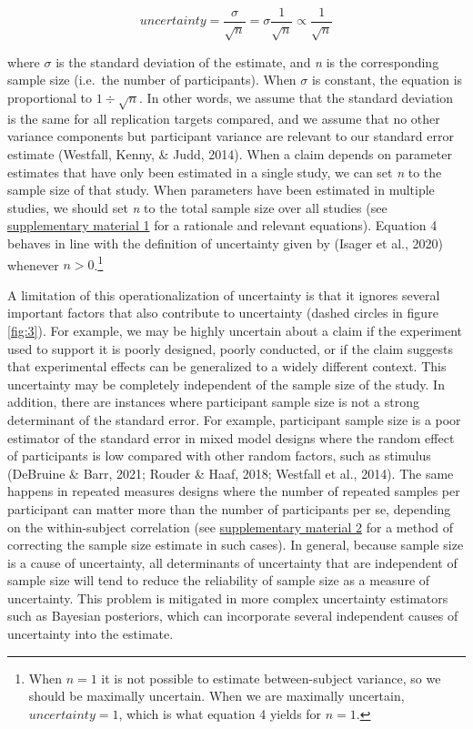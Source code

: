 \documentclass[
  english,
  man,floatsintext]{apa6}
\begin{document}
\begin{equation} 
  \tag{5}
  uncertainty=\frac{\sigma}{\sqrt{n}}=\sigma\frac{1}{\sqrt{n}}\propto\frac{1}{\sqrt{n}}
  \label{eq:5}
\end{equation}

where \(\sigma\) is the standard deviation of the estimate, and \emph{n} is the corresponding sample size (i.e.~the number of participants). When \(\sigma\) is constant, the equation is proportional to \(1\div\sqrt{n}\). In other words, we assume that the standard deviation is the same for all replication targets compared, and we assume that no other variance components but participant variance are relevant to our standard error estimate (Westfall, Kenny, \& Judd, 2014). When a claim depends on parameter estimates that have only been estimated in a single study, we can set \emph{n} to the sample size of that study. When parameters have been estimated in multiple studies, we should set \emph{n} to the total sample size over all studies (see \href{https://osf.io/rdhw3/}{supplementary material 1} for a rationale and relevant equations). Equation 4 behaves in line with the definition of uncertainty given by (Isager et al., 2020) whenever \(n>0\).\footnote{When \(n=1\) it is not possible to estimate between-subject variance, so we should be maximally uncertain. When we are maximally uncertain, \(uncertainty=1\), which is what equation 4 yields for \(n=1\).}

A limitation of this operationalization of uncertainty is that it ignores several important factors that also contribute to uncertainty (dashed circles in figure \ref{fig:3}). For example, we may be highly uncertain about a claim if the experiment used to support it is poorly designed, poorly conducted, or if the claim suggests that experimental effects can be generalized to a widely different context. This uncertainty may be completely independent of the sample size of the study. In addition, there are instances where participant sample size is not a strong determinant of the standard error. For example, participant sample size is a poor estimator of the standard error in mixed model designs where the random effect of participants is low compared with other random factors, such as stimulus (DeBruine \& Barr, 2021; Rouder \& Haaf, 2018; Westfall et al., 2014). The same happens in repeated measures designs where the number of repeated samples per participant can matter more than the number of participants per se, depending on the within-subject correlation (see \href{https://osf.io/pz5qa/}{supplementary material 2} for a method of correcting the sample size estimate in such cases). In general, because sample size is a cause of uncertainty, all determinants of uncertainty that are independent of sample size will tend to reduce the reliability of sample size as a measure of uncertainty. This problem is mitigated in more complex uncertainty estimators such as Bayesian posteriors, which can incorporate several independent causes of uncertainty into the estimate.
\end{document}

